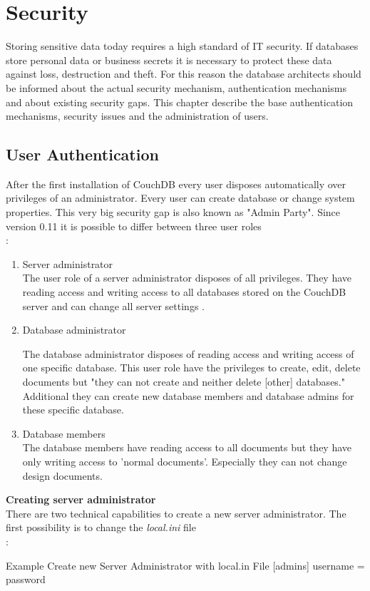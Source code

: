 \section{Security}

Storing sensitive data today requires a high standard of IT security. If databases store personal data or business secrets it is necessary to protect these data against loss, destruction and theft. For this reason the  database architects  should be informed about the actual security mechanism, authentication mechanisms and about existing security gaps. This chapter describe the base authentication mechanisms, security issues and the administration of users.

\subsection{User Authentication}
After the first installation of CouchDB every user disposes automatically over privileges of an administrator. Every user can create database or change system properties. This very big security gap is also known as "Admin Party". Since version 0.11 it is possible to differ between three user roles \\ \cite{ApacheSoftwareFoundation.2013.SecurityFeatures}:
\begin{enumerate}
\item Server administrator \\
The user role of a server administrator disposes of all privileges. They have reading access and writing access to all databases stored on the CouchDB server and can change all server settings \cite{Anderson.2010.Buch}.
\item Database administrator

The database administrator disposes of reading access and writing access of one specific database. This user role have the privileges to create, edit, delete documents but "they can not create and neither delete [other] databases." \cite{ApacheSoftwareFoundation.2013.SecurityFeatures}
Additional they can create new database members and database admins for these specific database.
\item Database members \\
The database members have reading access to all documents but they have only writing access to 'normal documents'. Especially they can not change design documents.
\end{enumerate}
\textbf{Creating server administrator}\\
There are two technical capabilities to create a new server administrator. The first possibility is to change the \textit{local.ini} file \\ \cite{ApacheSoftwareFoundation.2013.AdminAccount}:
\begin{mylisting}{Example Create new Server Administrator with local.in File \cite{ApacheSoftwareFoundation.2013.AdminAccount}}
[admins]
username = password
\end{mylisting}

